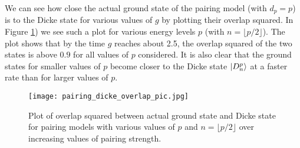 \documentclass[Dual]{msu-thesis}
\begin{document}
We can see how close the actual ground state of the pairing model (with $d_p=p$) is to the Dicke state for various values of $g$ by plotting their overlap squared. In Figure \ref{fig:pairing_dicke_overlap_pic}) we see such a plot for various energy levels $p$ (with $n=\lfloor p/2 \rfloor$). The plot shows that by the time $g$ reaches about 2.5, the overlap squared of the two states is above $0.9$ for all values of $p$ considered. It is also clear that the ground states for smaller values of $p$ become closer to the Dicke state $\ket{D^p_n}$ at a faster rate than for larger values of $p$.

\begin{figure}
    \centering
    \texttt{[image: pairing\_dicke\_overlap\_pic.jpg]}
    \caption{Plot of overlap squared between actual ground state and Dicke state for pairing models with various values of $p$ and $n=\lfloor p/2 \rfloor$ over increasing values of pairing strength.}
    \label{fig:pairing_dicke_overlap_pic}
\end{figure}
\end{document}
